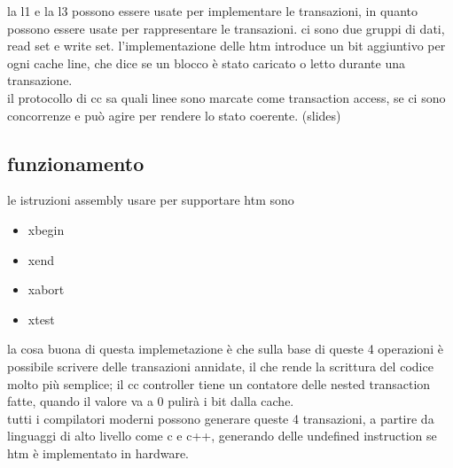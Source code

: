 \documentclass[12pt, oneside]{extbook} %
\begin{document}
la l1 e la l3 possono essere usate per implementare le transazioni, in quanto possono essere usate per rappresentare le transazioni. ci sono due gruppi di dati, read set e write set. l'implementazione delle htm introduce un bit aggiuntivo per ogni cache line, che dice se un blocco è stato caricato o letto durante una transazione.\\ il protocollo di cc sa quali linee sono marcate come transaction access, se ci sono concorrenze e può agire per rendere lo stato coerente. (slides)
\subsection{funzionamento}
le istruzioni assembly usare per supportare htm sono
\begin{itemize}
\item \textsf{xbegin}
\item \textsf{xend}
\item \textsf{xabort}
\item \textsf{xtest}
\end{itemize}
la cosa buona di questa implemetazione è che sulla base di queste 4 operazioni è possibile scrivere delle transazioni annidate, il che rende la scrittura del codice molto più semplice; il cc controller tiene un contatore delle nested transaction fatte, quando il valore va a 0 pulirà i bit dalla cache.\\ tutti i compilatori moderni possono generare queste 4 transazioni, a partire da linguaggi di alto livello come c e c++, generando delle undefined instruction se htm è implementato in hardware.\\
\end{document}
